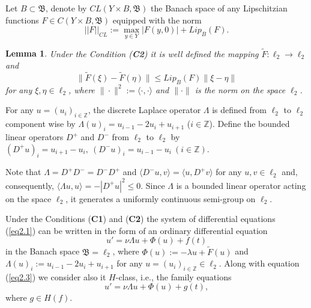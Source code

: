 \documentclass{amsart}%
\newtheorem{lemma}{Lemma}[section]
\begin{document}
Let $B \subset \mathfrak B$, denote by $CL(Y\times B,\mathfrak B)$
the Banach space of any Lipschitzian functions $F\in C(Y\times
B,\mathfrak B)$ equipped with the norm
\begin{equation}
||F||_{CL}:=\max\limits_{y\in Y}|F(y,0)|+Lip_{B}(F).\nonumber
\end{equation}

\begin{lemma}\label{l2.2} \cite{BLW_2001} Under the Condition (\textbf{C2})
it is well defined the mapping $\widetilde{F}:\ell_{2}\to
\ell_{2}$ and
\begin{equation}\label{eq2.2}
\|\widetilde{F}(\xi)-\widetilde{F}(\eta)\|\le Lip_{B}(F)\|\xi
-\eta \| \nonumber
\end{equation}
for any $\xi,\eta\in \ell_{2}$, where $\|\cdot\|^{2}:=\langle
\cdot,\cdot \rangle$ and $\|\cdot \|$ is the norm on the space
$\ell_{2}$.
\end{lemma}

For any $u = (u_{i})_{i\in \mathbb Z}$, the discrete Laplace
operator $\Lambda$ is defined \cite[Ch.III]{HK_2023} from
$\ell_{2}$ to $\ell_{2}$ component wise by $\Lambda(u)_{i} =
u_{i-1} - 2u_{i} + u_{i+1}$ ($i\in \mathbb Z$). Define the
bounded linear operators $D^{+}$ and $D^{-}$ from $\ell_{2}$ to
$\ell_{2}$ by $(D^{+}u)_{i} = u_{i+1} - u_{i},\ (D^{-}u)_{i} =
u_{i-1} - u_{i}\ (i\in \mathbb Z)$.

Note that $\Lambda = D^{+}D^{-} = D^{-}D^{+}$ and $\langle D^{-}u,
v\rangle = \langle u, D^{+}v\rangle $ for any $u,v\in \ell_{2}$
and, consequently, $\langle \Lambda u,u \rangle = -|D^{+}u|^{2}\le
0$. Since $\Lambda$ is a bounded linear operator acting on the
space $\ell_{2}$, it generates a uniformly continuous semi-group
on $\ell_{2}$.

Under the Conditions (\textbf{C1}) and (\textbf{C2}) the system of
differential equations (\ref{eq2.1}) can be written in the form of
an ordinary differential equation
\begin{equation}\label{eq2.3}
u'=\nu \Lambda u +\Phi (u)+f(t)
\end{equation}
in the Banach space $\mathfrak B=\ell_{2}$, where
$\Phi(u):=-\lambda u +\widetilde{F} (u)$ and
$\Lambda(u)_{i}:=u_{i-1}-2u_{i}+u_{i+1}$ for any $u=(u_i)_{i\in
\mathbb Z}\in \ell_{2}$. Along with equation (\ref{eq2.3}) we
consider also it $H$-class, i.e., the family equations
\begin{equation}\label{eq2.3g}
u'=\nu \Lambda u +\Phi (u)+g(t),
\end{equation}
where $g\in H(f)$.
\end{document}
